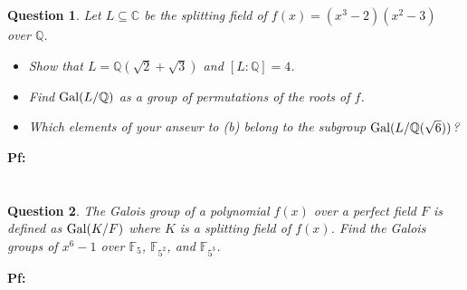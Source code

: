 \documentclass{article}
\newtheorem{question}{Question}
\newcommand{\FF}{\mathbb{F}}
\newcommand{\QQ}{\mathbb{Q}}
\newcommand{\CC}{\mathbb{C}}
\newcommand{\Gal}{\textmd{Gal}}
\begin{document}
\section{}
\begin{question}\label{q4}
    Let $L\subseteq \CC$ be the splitting field of $f(x)=(x^3-2)(x^2-3)$ over $\QQ$.
    \begin{itemize}
        \item[(a)] Show that $L=\QQ(\sqrt{2}+\sqrt{3})$ and $[L:\QQ]=4$.
        \item[(b)] Find $\Gal(L/\QQ)$ as a group of permutations of the roots of $f$.
        \item[(c)] Which elements of your ansewr to (b) belong to the subgroup $\Gal(L/\QQ(\sqrt{6}))$?  
    \end{itemize}
\end{question}

\textbf{Pf:}

\break

\section{}
\begin{question}\label{q5}
    The Galois group of a polynomial $f(x)$ over a perfect field $F$ is defined as $\Gal(K/F)$ where $K$ is a splitting field of $f(x)$. Find the Galois groups of $x^6-1$ over $\FF_5$, $\FF_{5^2}$, and $\FF_{5^3}$.
\end{question}

\textbf{Pf:}
\end{document}

